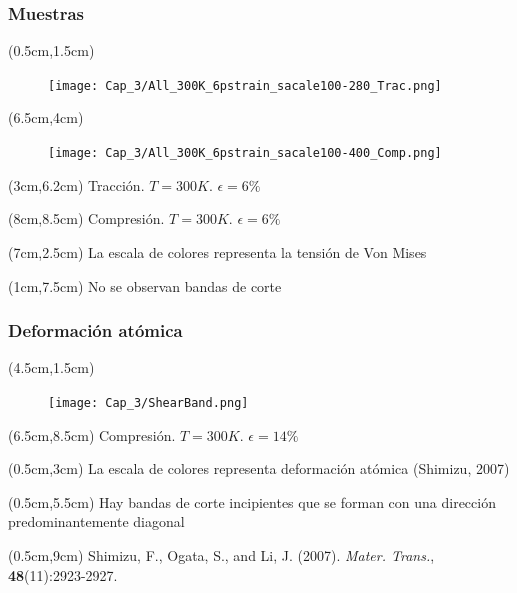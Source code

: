 \begin{frame}
  \frametitle{Muestras}
  \begin{textblock*}{6cm}(0.5cm,1.5cm)
    \begin{figure}[htp]
      \centering
      \texttt{[image: Cap\_3/All\_300K\_6pstrain\_sacale100-280\_Trac.png]}
    \end{figure}
  \end{textblock*}
  \begin{textblock*}{6cm}(6.5cm,4cm)
    \begin{figure}[htp]
      \centering
      \texttt{[image: Cap\_3/All\_300K\_6pstrain\_sacale100-400\_Comp.png]}
    \end{figure}
  \end{textblock*}
  \begin{textblock*}{4cm}(3cm,6.2cm)
   \scriptsize{Tracci\'on. $T=300K$. $\epsilon=6\%$}
  \end{textblock*}
  \begin{textblock*}{5cm}(8cm,8.5cm)
   \scriptsize{Compresi\'on. $T=300K$. $\epsilon=6\%$}
  \end{textblock*}
  \begin{textblock*}{5cm}(7cm,2.5cm)
   \centering
   La escala de colores representa la tensi\'on de Von Mises
  \end{textblock*}
  \begin{textblock*}{5cm}(1cm,7.5cm)
   \centering
   No se observan bandas de corte
  \end{textblock*}
\end{frame}

\begin{frame}
  \frametitle{Deformaci\'on at\'omica}
  \begin{textblock*}{4cm}(4.5cm,1.5cm)
    \begin{figure}[htp]
      \centering
      \texttt{[image: Cap\_3/ShearBand.png]}
    \end{figure}
  \end{textblock*}
  \begin{textblock*}{5cm}(6.5cm,8.5cm)
   \scriptsize{Compresi\'on. $T=300K$. $\epsilon=14\%$}
  \end{textblock*}
  \begin{textblock*}{5cm}(0.5cm,3cm)
   \centering
   La escala de colores representa deformaci\'on at\'omica (Shimizu, 2007)
  \end{textblock*}
  \begin{textblock*}{5cm}(0.5cm,5.5cm)
   \centering
   Hay bandas de corte incipientes que se forman con una direcci\'on predominantemente diagonal
  \end{textblock*}
    \begin{textblock*}{12cm}(0.5cm,9cm) %
        \scriptsize{Shimizu, F., Ogata, S., and Li, J. (2007). \textit{Mater. Trans.}, \textbf{48}(11):2923-2927.}
    \end{textblock*}  
\end{frame}


